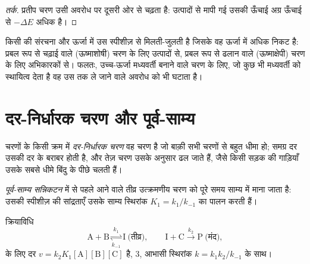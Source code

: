 \begin{proof}[तर्क]
प्रतीप चरण उसी अवरोध पर दूसरी ओर से चढ़ता है: उत्पादों से मापी गई उसकी
ऊँचाई अग्र ऊँचाई से $-\Delta E$ अधिक है।
\end{proof}

\begin{proposition}[हैमंड अभिगृहीत]\label{prop:b1:elementary-steps:hammond}
किसी  की  संरचना और ऊर्जा में उस स्पीशीज़ से मिलती-जुलती है
जिसके वह ऊर्जा में अधिक निकट है: प्रबल रूप से चढ़ाई वाले (ऊष्माशोषी) चरण के लिए
उत्पादों से, प्रबल रूप से ढलान वाले (ऊष्माक्षेपी) चरण के लिए अभिकारकों से।
फलतः, उच्च-ऊर्जा मध्यवर्ती बनाने वाले चरण के लिए, जो कुछ भी
मध्यवर्ती को स्थायित्व देता है वह उस तक ले जाने वाले अवरोध को भी
घटाता है।
\end{proposition}
\admitted

\section{दर-निर्धारक चरण और पूर्व-साम्य}

\begin{definition}[दर-निर्धारक चरण]\label{def:b1:elementary-steps:rds}
चरणों के किसी क्रम में \emph{दर-निर्धारक
चरण} वह चरण है जो बाक़ी सभी चरणों से बहुत धीमा हो;
समग्र दर उसकी दर के बराबर होती है, और तेज़ चरण उसके अनुसार
ढल जाते हैं, जैसे किसी सड़क की गाड़ियाँ उसके सबसे धीमे बिंदु के पीछे चलती हैं।
\end{definition}

\begin{definition}[पूर्व-साम्य सन्निकटन]\label{def:b1:elementary-steps:pre-equilibrium}
\emph{पूर्व-साम्य सन्निकटन} में
 से पहले आने वाले तीव्र उत्क्रमणीय चरण को
पूरे समय साम्य में माना जाता है: उसकी स्पीशीज़ की सांद्रताएँ
उसके साम्य स्थिरांक $K_1 = k_1/k_{-1}$ का पालन करती हैं।
\end{definition}

\begin{proposition}[पूर्व-साम्य से दर नियम]\label{prop:b1:elementary-steps:pre-equilibrium-law}
क्रियाविधि
\[
  \mathrm{A} + \mathrm{B} \underset{k_{-1}}{\overset{k_1}{\rightleftharpoons}} \mathrm{I}
  \ \text{(तीव्र)}, \qquad
  \mathrm{I} + \mathrm{C} \xrightarrow{\ k_2\ } \mathrm{P} \ \text{(मंद)},
\]
के लिए दर $v = k_2K_1[\mathrm{A}][\mathrm{B}][\mathrm{C}]$ है,  3, आभासी स्थिरांक $k = k_1k_2/k_{-1}$ के साथ।
\end{proposition}

